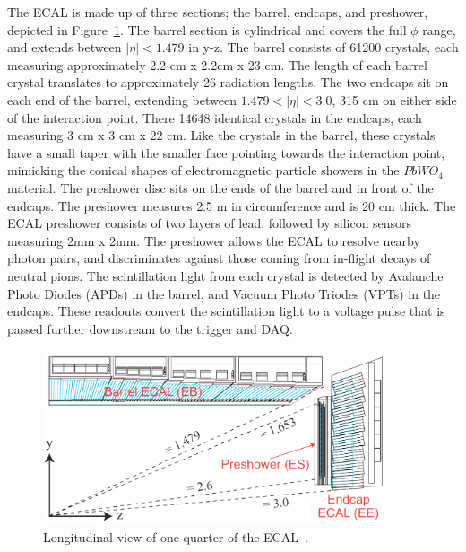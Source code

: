 The ECAL is made up of three sections; the barrel, endcaps, and preshower, depicted in Figure~\ref{fig:cms_ecal}. The barrel section is cylindrical and covers the full $\phi$
range, and extends between $|\eta| < 1.479$ in y-z. The barrel consists of 61200 crystals, each measuring approximately 2.2 cm x 2.2cm x 23 cm. The length of each barrel
crystal translates to approximately 26 radiation lengths. The two endcaps sit on each end of the barrel, extending between $1.479 < |\eta|< 3.0$, 315 cm on either side of
the interaction point. There 14648 identical crystals in the endcaps, each measuring 3 cm x 3 cm x 22 cm. Like the crystals in the barrel, these crystals have a small taper
with the smaller face pointing towards the interaction point, mimicking the conical shapes of electromagnetic particle showers in the $PbWO_{4}$ material.
The preshower disc sits on the ends of the barrel and in front of the endcaps. The preshower measures 2.5 m in circumference and is 20 cm thick. The ECAL preshower consists of two layers
of lead, followed by silicon sensors measuring 2mm x 2mm. The preshower allows the ECAL to resolve nearby photon pairs, and discriminates against those coming from in-flight decays
of neutral pions. The scintillation light from each crystal is detected by Avalanche Photo Diodes (APDs) in the barrel, and Vacuum Photo Triodes (VPTs) in the endcaps.
These readouts convert the scintillation light to a voltage pulse that is passed further downstream to the trigger and DAQ. 

\begin{figure}[hbtp]
 \begin{center}
   \includegraphics[width=0.9\textwidth]{ch3_figs/ecal_rapidity.pdf}
   \caption[Longitudinal view of the CMS ECAL]{Longitudinal view of one quarter of the ECAL~\cite{cms_bluebook}.}
   \label{fig:cms_ecal}
 \end{center}
\end{figure}

